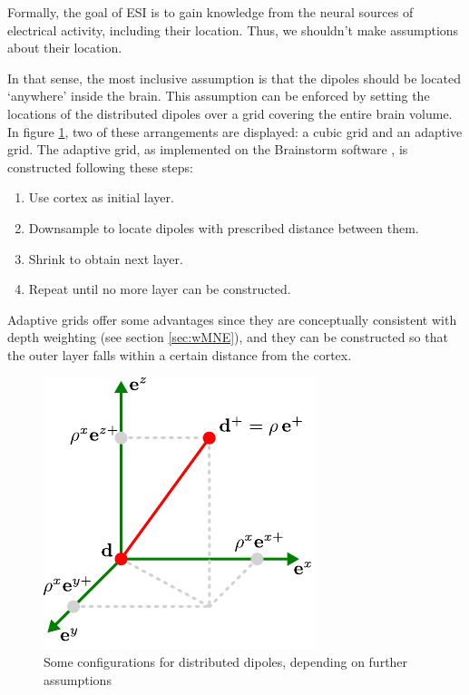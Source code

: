 Formally, the goal of ESI is to gain knowledge from the neural sources of electrical activity, including their location. 
%
Thus, we shouldn't make assumptions about their location.

In that sense, the most inclusive assumption is that the dipoles should be located `anywhere' inside the brain.
%
This assumption can be enforced by setting the locations of the distributed dipoles over a grid covering the entire brain volume.
%
In figure \ref{fig:dipoles}, two of these arrangements are displayed: a cubic grid and an adaptive grid. 
%
The adaptive grid, as implemented on the Brainstorm software \cite{brainstorm}, is constructed following these steps:
\begin{enumerate}
    \item Use cortex as initial layer.
    \item Downsample to locate dipoles with prescribed distance between them.
    \item Shrink to obtain next layer.
    \item Repeat until no more layer can be constructed.
\end{enumerate}

Adaptive grids offer some advantages since they are conceptually consistent with depth weighting (see section \ref{sec:wMNE}), and they can be constructed so that the outer layer falls within a certain distance from the cortex.

\begin{figure}
\centering
\includegraphics[scale=1.2]{./img/OrthDecomp}
\caption{Some configurations for distributed dipoles, depending on further assumptions}
\label{fig:dipoles}
\end{figure}

